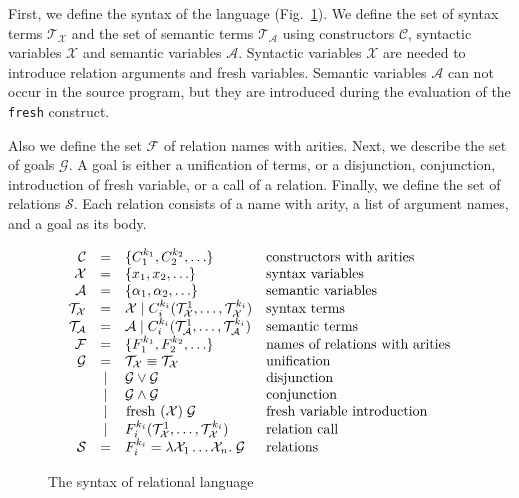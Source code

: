 First, we define the syntax of the language (Fig.~\ref{fair:syntax}). We define the set of syntax terms $\mathcal{T}_\mathcal{X}$ and the set of semantic terms
$\mathcal{T}_\mathcal{A}$ using constructors $\mathcal{C}$, syntactic variables $\mathcal{X}$ and semantic variables $\mathcal{A}$. Syntactic variables $\mathcal{X}$
are needed to introduce relation arguments and fresh variables. Semantic variables $\mathcal{A}$ can not occur in the source program, but they are introduced during
the evaluation of the \lstinline{fresh} construct.

Also we define the set $\mathcal{F}$ of relation names with arities. Next, we describe the set of goals $\mathcal{G}$. A goal is either a unification of terms, or a disjunction, conjunction, introduction
of fresh variable, or a call of a relation. Finally, we define the set of relations $\mathcal{S}$. Each relation consists of a name with arity, a list of argument names,
and a goal as its body.

\begin{figure}[h]
\[
  \begin{array}{rcll}
     \mathcal{C} & = & \{ C_1^{k_1}, C_2^{k_2}, \ldots \} 
     & \mbox{constructors with arities} 
     \\
     \mathcal{X} & = & \{x_1, x_2, \ldots \} 
     & \mbox{syntax variables} 
     \\
     \mathcal{A} & = & \{\alpha_1, \alpha_2, \ldots \} 
     & \mbox{semantic variables} 
     \\
     \mathcal{T}_\mathcal{X} & = & \mathcal{X} \mid C_i^{k_i}(\mathcal{T}_\mathcal{X}^1, \ldots, \mathcal{T}_\mathcal{X}^{k_i})
     & \mbox{syntax terms} 
     \\
     \mathcal{T}_\mathcal{A} & = & \mathcal{A} \mid C_i^{k_i}(\mathcal{T}_\mathcal{A}^1, \ldots, \mathcal{T}_\mathcal{A}^{k_i})
     & \mbox{semantic terms} 
     \\
     \mathcal{F} & = & \{F_1^{k_1}, F_2^{k_2}, \ldots \} 
     & \mbox{names of relations with arities} 
     \\
     \mathcal{G} & =    & \mathcal{T}_\mathcal{X} \equiv \mathcal{T}_\mathcal{X} & \mbox{unification} \\
                 & \mid & \mathcal{G} \lor \mathcal{G} & \mbox{disjunction} \\
                 & \mid & \mathcal{G} \land \mathcal{G} & \mbox{conjunction} \\
                 & \mid & \mbox{\lstinline|fresh|} \; (\mathcal{X}) \; \mathcal{G} & \mbox{fresh variable introduction} \\
                 & \mid &  F_i^{k_i}(\mathcal{T}_\mathcal{X}^1, \ldots, \mathcal{T}_\mathcal{X}^{k_i}) & \mbox{relation call} \\
    \mathcal{S} & = &F_i^{k_i} = \lambda \mathcal{X}_1 \ldots \mathcal{X}_n. \; \mathcal{G} & \mbox{relations}
  \end{array}
\]
    \caption{The syntax of relational language}
    \label{fair:syntax}
\end{figure}

